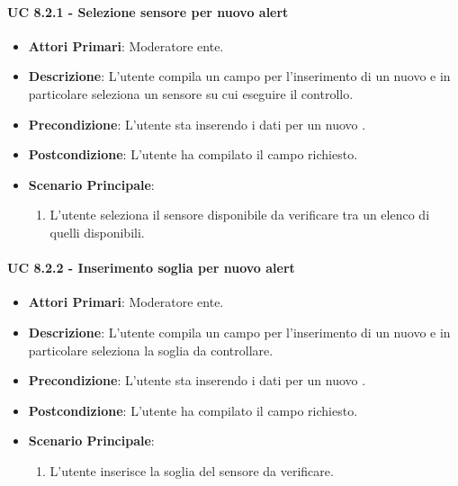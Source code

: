 				\paragraph{UC 8.2.1 - Selezione sensore per nuovo alert}
				\begin{itemize}
					\item \textbf{Attori Primari}: Moderatore ente.
					\item \textbf{Descrizione}: L'utente compila un campo per l'inserimento di un nuovo  e in particolare seleziona un sensore su cui eseguire il controllo.
					\item \textbf{Precondizione}: L'utente sta inserendo i dati per un nuovo .
					\item \textbf{Postcondizione}: L'utente ha compilato il campo richiesto.
					\item \textbf{Scenario Principale}:
					\begin{enumerate}
						\item{L'utente seleziona il sensore disponibile da verificare tra un elenco di quelli disponibili.}
					\end{enumerate}	
				\end{itemize}

				\paragraph{UC 8.2.2 - Inserimento soglia per nuovo alert}
				\begin{itemize}
					\item \textbf{Attori Primari}: Moderatore ente.
					\item \textbf{Descrizione}: L'utente compila un campo per l'inserimento di un nuovo  e in particolare seleziona la soglia da controllare.
					\item \textbf{Precondizione}: L'utente sta inserendo i dati per un nuovo .
					\item \textbf{Postcondizione}: L'utente ha compilato il campo richiesto.
					\item \textbf{Scenario Principale}:
					\begin{enumerate}
						\item{L'utente inserisce la soglia del sensore da verificare.}
					\end{enumerate}	
				\end{itemize}

